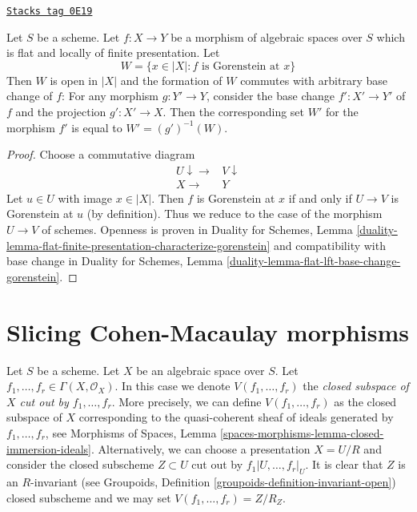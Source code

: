 \begin{lemma}
\label{spaces-more-morphisms-lemma-flat-finite-presentation-gorenstein-open}
\href{https://stacks.math.columbia.edu/tag/0E19}{\texttt{Stacks tag 0E19}}

Let $S$ be a scheme.
Let $f : X \to Y$ be a morphism of algebraic spaces over $S$
which is flat and locally of finite presentation. Let
$$
W = \{x \in |X| : f\text{ is Gorenstein at }x\}
$$
Then $W$ is open in $|X|$ and the formation of $W$
commutes with arbitrary base change of $f$:
For any morphism $g : Y' \to Y$, consider
the base change $f' : X' \to Y'$ of $f$ and the
projection $g' : X' \to X$. Then the corresponding
set $W'$ for the morphism $f'$ is equal to $W' = (g')^{-1}(W)$.
\end{lemma}

\begin{proof}
Choose a commutative diagram
$$
\begin{array}{cc}U \downarrow\longrightarrow & V \downarrow \\ X \longrightarrow & Y\end{array}
$$
Let $u \in U$ with image $x \in |X|$.
Then $f$ is Gorenstein at $x$ if and only if $U \to V$ is
Gorenstein at $u$ (by definition).
Thus we reduce to the case of the morphism $U \to V$
of schemes. Openness is proven in
Duality for Schemes, Lemma
\ref{duality-lemma-flat-finite-presentation-characterize-gorenstein}
and compatibility with base change in
Duality for Schemes, Lemma \ref{duality-lemma-flat-lft-base-change-gorenstein}.
\end{proof}

\section{Slicing Cohen-Macaulay morphisms}
\label{spaces-more-morphisms-section-slice}
Let $S$ be a scheme. Let $X$ be an algebraic space over $S$.
Let $f_1, \ldots, f_r \in \Gamma(X, \mathcal{O}_X)$. In this case we
denote $V(f_1, \ldots, f_r)$ the {\it closed subspace of $X$ cut out by
$f_1, \ldots, f_r$}. More precisely, we can define $V(f_1, \ldots, f_r)$
as the closed subspace of $X$ corresponding to the quasi-coherent sheaf
of ideals generated by $f_1, \ldots, f_r$, see
Morphisms of Spaces, Lemma
\ref{spaces-morphisms-lemma-closed-immersion-ideals}.
Alternatively, we can choose a presentation $X = U/R$ and consider the
closed subscheme $Z \subset U$ cut out by $f_1|U, \ldots, f_r|_U$.
It is clear that $Z$ is an $R$-invariant (see
Groupoids, Definition \ref{groupoids-definition-invariant-open})
closed subscheme and we may set $V(f_1, \ldots, f_r) = Z/R_Z$.

